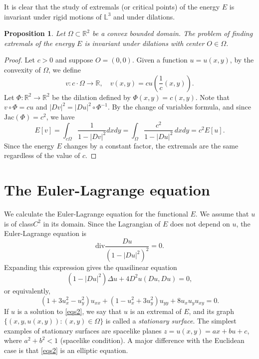 \documentclass[a4paper,12pt]{amsart}
\newtheorem{proposition}[theorem]{Proposition}
\theoremstyle{definition}
\def\r{\mathbb R}
\def\l{\mathbb L}
\begin{document}
It is clear that the study of extremals (or critical points) of the energy $E$ is invariant under  rigid motions of $\l^3$ and under dilations.

\begin{proposition} \label{pr-22}
Let $\Omega\subset\r^2$ be a convex bounded domain. The problem of finding extremals of the energy $E$ is invariant under  dilations with center $O\in\Omega$.
\end{proposition}

\begin{proof} 
Let  $c>0$ and suppose $O=(0,0)$. Given a function $u=u(x,y)$, by the convexity of $\Omega$, we define 
$$v\colon c\cdot \Omega\to\r, \quad v(x,y)=c u(\frac{1}{c}(x,y)).$$
Let $\Phi\colon\r^2\to\r^2$ be the dilation defined by $\Phi(x,y)=c(x,y)$. Note that $v\circ\Phi=cu$ and $|Dv|^2=|Du|^2\circ \Phi^{-1}$. By the  change of variables formula, and since $\mbox{Jac}(\Phi)=c^2$, we have 
\begin{equation*}
E[v]=\int_{c\Omega}\frac{1}{1-|Dv|^2}dxdy =
\int_\Omega\frac{c^2}{1-|Du|^2}\, dxdy=c^2 E[u].
\end{equation*}
Since the energy $E$ changes by a constant factor, the extremals are the same regardless of the value of $c$.
\end{proof}
\section{The Euler-Lagrange equation}\label{s3}

We calculate the Euler-Lagrange equation for the functional $E$. We assume that $u$ is of class$C^2$ in its domain. Since the Lagrangian  of $E$ does not depend on $u$, the Euler-Lagrange equation is 
$$\mbox{div}\frac{Du}{(1-|Du|^2)^2}=0.$$
Expanding this expression gives the quasilinear equation 
\begin{equation}\label{eqs}
(1-|Du|^2)\Delta u+4 D^2u(Du,Du)=0,
\end{equation}
or equivalently, 
\begin{equation}\label{eqs2}
(1+3u_x^2-u_y^2)u_{xx}+(1-u_x^2+3u_y^2)u_{yy}+8 u_x u_y u_{xy}=0.
\end{equation}
  If $u$ is a solution to \eqref{eqs2}, we say that $u$ is an extremal of $E$, and its graph   $\{(x,y,u(x,y))\colon (x,y)\in\Omega\}$  is called a {\it stationary surface}. The simplest examples of  stationary surfaces are spacelike planes $z= u(x,y)=ax+bu+c$, where $a^2+b^2<1$ (spacelike condition). A major difference with the Euclidean case is that \eqref{eqs2} is an elliptic equation.
\end{document}
